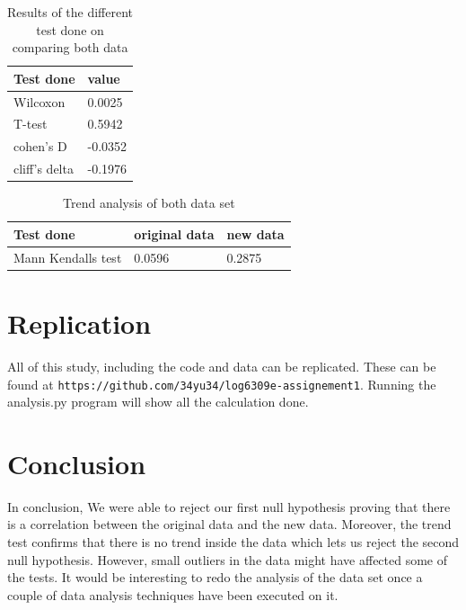\documentclass[10pt, conference]{IEEEtran}
\begin{document}
\begin{table}
    \centering
    \begin{tabular}[h]{|l|l|}
        \hline
        \textbf{Test done} &  \textbf{value} \\ \hline \hline
        Wilcoxon & 0.0025  \\ \hline 
        T-test & 0.5942 \\ \hline \hline
        cohen's D & -0.0352 \\ \hline 
        cliff's delta & -0.1976 \\ \hline 
    \end{tabular}        
    \caption{Results of the different test done on comparing both data}
    \label{tab:res23}
\end{table}

\begin{table}
    \centering
    \begin{tabular}[h]{|l|l|l|}
        \hline
        \textbf{Test done} &  \textbf{original data} & \textbf{new data} \\ \hline
        Mann Kendalls test & 0.0596 & 0.2875 \\ \hline 
    \end{tabular}        
    \caption{Trend analysis of both data set}
    \label{tab:trend}
\end{table}

\section{Replication}
\label{sec:replication}

All of this study, including the code and data can be replicated. 
These can be found at \verb|https://github.com/34yu34/log6309e-assignement1|.
Running the analysis.py program will show all the calculation done.

\section{Conclusion}
\label{sec:conclusion}

In conclusion, We were able to reject our first null hypothesis proving that there is a correlation between the original data and the new data. 
Moreover, the trend test confirms that there is no trend inside the data which lets us reject the second null hypothesis.
However, small outliers in the data might have affected some of the tests.
It would be interesting to redo the analysis of the data set once a couple of data analysis techniques have been executed on it. 


\balance
%
%
\end{document}
